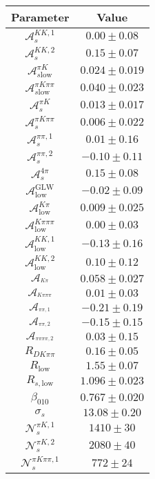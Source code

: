 \begin{table}
  \centering
  \begin{tabular}{cc}
      \toprule
      Parameter & Value \\
      \midrule
$\mathcal{A}_s^{KK,1}$ & $0.00 \pm 0.08$ \\
$\mathcal{A}_s^{KK,2}$ & $0.15 \pm 0.07$ \\
$\mathcal{A}_{s \mathrm{low}}^{\pi K}$ & $0.024 \pm 0.019$ \\
$\mathcal{A}_{s \mathrm{low}}^{\pi K\pi\pi}$ & $0.040 \pm 0.023$ \\
$\mathcal{A}_s^{\pi K}$ & $0.013 \pm 0.017$ \\
$\mathcal{A}_s^{\pi K\pi\pi}$ & $0.006 \pm 0.022$ \\
$\mathcal{A}_s^{\pi\pi,1}$ & $0.01 \pm 0.16$ \\
$\mathcal{A}_s^{\pi\pi,2}$ & $-0.10 \pm 0.11$ \\
$\mathcal{A}_s^{4\pi}$ & $0.15 \pm 0.08$ \\
$\mathcal{A}_\mathrm{low}^\mathrm{GLW}$ & $-0.02 \pm 0.09$ \\
$\mathcal{A}_\mathrm{low}^{K\pi}$ & $0.009 \pm 0.025$ \\
$\mathcal{A}_\mathrm{low}^{K\pi\pi\pi}$ & $0.00 \pm 0.03$ \\
$\mathcal{A}_\mathrm{low}^{KK,1}$ & $-0.13 \pm 0.16$ \\
$\mathcal{A}_\mathrm{low}^{KK,2}$ & $0.10 \pm 0.12$ \\
$\mathcal{A}_^{K\pi}$ & $0.058 \pm 0.027$ \\
$\mathcal{A}_^{K\pi\pi\pi}$ & $0.01 \pm 0.03$ \\
$\mathcal{A}_^{\pi\pi,1}$ & $-0.21 \pm 0.19$ \\
$\mathcal{A}_^{\pi\pi,2}$ & $-0.15 \pm 0.15$ \\
$\mathcal{A}_^{\pi\pi\pi\pi,2}$ & $0.03 \pm 0.15$ \\
$R_{DK\pi\pi}$ & $0.16 \pm 0.05$ \\
$R_\mathrm{low}$ & $1.55 \pm 0.07$ \\
$R_{s, \mathrm{low}}$ & $1.096 \pm 0.023$ \\
$\beta_{010}$ & $0.767 \pm 0.020$ \\
$\sigma_s$ & $13.08 \pm 0.20$ \\
$\mathcal{N}_s^{\pi K,1}$ & $1410 \pm 30$ \\
$\mathcal{N}_s^{\pi K,2}$ & $2080 \pm 40$ \\
$\mathcal{N}_s^{\pi K\pi\pi,1}$ & $772 \pm 24$ \\

\end{tabular}
\end{table}
